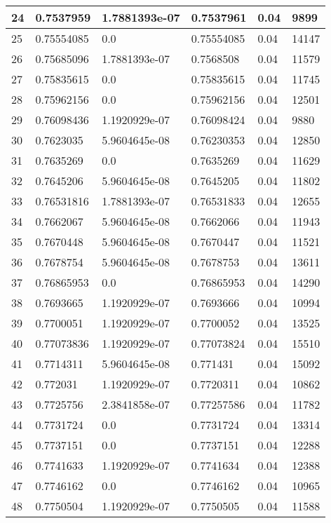 \begin{longtable}{|l|l|l|l|l|l|}
24 & 0.7537959 & 1.7881393e-07 & 0.7537961 & 0.04 & 9899 \\ \hline 
25 & 0.75554085 & 0.0 & 0.75554085 & 0.04 & 14147 \\ \hline 
26 & 0.75685096 & 1.7881393e-07 & 0.7568508 & 0.04 & 11579 \\ \hline 
27 & 0.75835615 & 0.0 & 0.75835615 & 0.04 & 11745 \\ \hline 
28 & 0.75962156 & 0.0 & 0.75962156 & 0.04 & 12501 \\ \hline 
29 & 0.76098436 & 1.1920929e-07 & 0.76098424 & 0.04 & 9880 \\ \hline 
30 & 0.7623035 & 5.9604645e-08 & 0.76230353 & 0.04 & 12850 \\ \hline 
31 & 0.7635269 & 0.0 & 0.7635269 & 0.04 & 11629 \\ \hline 
32 & 0.7645206 & 5.9604645e-08 & 0.7645205 & 0.04 & 11802 \\ \hline 
33 & 0.76531816 & 1.7881393e-07 & 0.76531833 & 0.04 & 12655 \\ \hline 
34 & 0.7662067 & 5.9604645e-08 & 0.7662066 & 0.04 & 11943 \\ \hline 
35 & 0.7670448 & 5.9604645e-08 & 0.7670447 & 0.04 & 11521 \\ \hline 
36 & 0.7678754 & 5.9604645e-08 & 0.7678753 & 0.04 & 13611 \\ \hline 
37 & 0.76865953 & 0.0 & 0.76865953 & 0.04 & 14290 \\ \hline 
38 & 0.7693665 & 1.1920929e-07 & 0.7693666 & 0.04 & 10994 \\ \hline 
39 & 0.7700051 & 1.1920929e-07 & 0.7700052 & 0.04 & 13525 \\ \hline 
40 & 0.77073836 & 1.1920929e-07 & 0.77073824 & 0.04 & 15510 \\ \hline 
41 & 0.7714311 & 5.9604645e-08 & 0.771431 & 0.04 & 15092 \\ \hline 
42 & 0.772031 & 1.1920929e-07 & 0.7720311 & 0.04 & 10862 \\ \hline 
43 & 0.7725756 & 2.3841858e-07 & 0.77257586 & 0.04 & 11782 \\ \hline 
44 & 0.7731724 & 0.0 & 0.7731724 & 0.04 & 13314 \\ \hline 
45 & 0.7737151 & 0.0 & 0.7737151 & 0.04 & 12288 \\ \hline 
46 & 0.7741633 & 1.1920929e-07 & 0.7741634 & 0.04 & 12388 \\ \hline 
47 & 0.7746162 & 0.0 & 0.7746162 & 0.04 & 10965 \\ \hline 
48 & 0.7750504 & 1.1920929e-07 & 0.7750505 & 0.04 & 11588 \\ \hline 

\end{longtable}
